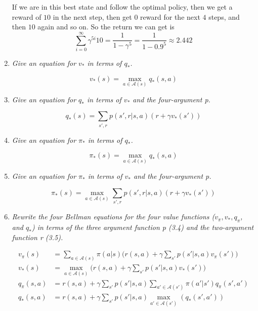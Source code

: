 \documentclass[12pt,a4paper]{article}
\begin{document}
\begin{enumerate}
  If we are in this best state and follow the optimal policy, then we get a reward of $10$
  in the next step, then get $0$ reward for the next $4$ steps, and then $10$ again and so on.
  So the return we can get is
  \[\sum\limits_{i = 0}^{\infty} \gamma^{5i} 10 = \frac{1}{1 - \gamma^5} = \frac{1}{1 - 0.9^5} \approx 2.442\]

\item
  \textit{Give an equation for $v_\ast$ in terms of $q_\ast$.}

  \[v_\ast(s) = \max_{a \in \mathcal{A}(s)} q_\ast(s, a)\]

\item
  \textit{Give an equation for $q_\ast$ in terms of $v_\ast$ and the four-argument p.}

  \[q_\ast(s) = \sum\limits_{s', r}p(s', r | s, a) (r + \gamma v_\ast(s'))\]

\item
  \textit{Give an equation for $\pi_\ast$ in terms of $q_\ast$.}

  \[\pi_\ast(s) = \max_{a \in \mathcal{A}(s)} q_\ast(s, a)\]

\item
  \textit{Give an equation for $\pi_\ast$ in terms of $v_\ast$ and the four-argument p.}

  \[\pi_\ast(s) = \max_{a \in \mathcal{A}(s)} \sum\limits_{s', r}p(s', r | s, a) (r + \gamma v_\ast(s'))\]

\item
  \textit{Rewrite the four Bellman equations for the four value functions ($v_\pi, v_\ast, q_\pi$,
  and $q_\ast$) in terms of the three argument function p (3.4) and the two-argument function r
  (3.5).}

  \begin{align*}
    v_\pi(s) &= \sum\limits_{a \in \mathcal{A}(s)} \pi(a|s) \Big(r(s, a)
    + \gamma \sum\limits_{s'} p(s'|s, a)v_\pi(s')\Big)\\
    v_\ast(s) &= \max_{a \in \mathcal{A}(s)} \Big(r(s, a)
    + \gamma \sum\limits_{s'} p(s'|s, a)v_\ast(s')\Big)\\
    q_\pi(s, a) &= r(s, a) + \gamma \sum\limits_{s'} p(s'|s, a)
    \sum\limits_{a' \in \mathcal{A}(s')}\pi(a'|s')q_\pi(s', a')\\
    q_\ast(s, a) &= r(s, a) + \gamma \sum\limits_{s'} p(s'|s, a)
    \max_{a' \in \mathcal{A}(s')}(q_\ast(s', a'))\\
  \end{align*}

\end{enumerate}
\end{document}
